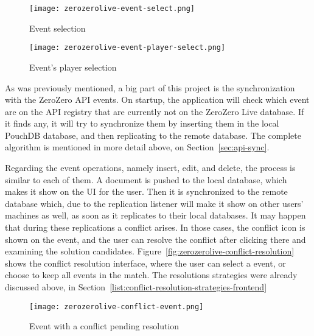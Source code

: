 \begin{figure}[ht]
    \begin{center}
        \leavevmode
        \texttt{[image: zerozerolive-event-select.png]}
        \caption{Event selection}
        \label{fig:zerozerolive-event-select}
    \end{center}
\end{figure}

\begin{figure}[ht]
    \begin{center}
        \leavevmode
        \texttt{[image: zerozerolive-event-player-select.png]}
        \caption{Event's player selection}
        \label{fig:zerozerolive-event-player-select}
    \end{center}
\end{figure}

As was previously mentioned, a big part of this project is the synchronization with the ZeroZero API events. On startup, the application will check which event are on the API registry that are currently not on the ZeroZero Live database. If it finds any, it will try to synchronize them by inserting them in the local PouchDB database, and then replicating to the remote database. The complete algorithm is mentioned in more detail above, on Section~\ref{sec:api-sync}. 

Regarding the event operations, namely insert, edit, and delete, the process is similar to each of them. A document is pushed to the local database, which makes it show on the UI for the user. Then it is synchronized to the remote database which, due to the replication listener will make it show on other users' machines as well, as soon as it replicates to their local databases. It may happen that during these replications a conflict arises. In those cases, the conflict icon is shown on the event, and the user can resolve the conflict after clicking there and examining the solution candidates. Figure~\ref{fig:zerozerolive-conflict-resolution} shows the conflict resolution interface, where the user can select a  event, or choose to keep all events in the match. The resolutions strategies were already discussed above, in Section~\ref{list:conflict-resolution-strategies-frontend}

\begin{figure}[ht]
    \begin{center}
        \leavevmode
        \texttt{[image: zerozerolive-conflict-event.png]}
        \caption{Event with a conflict pending resolution}
        \label{fig:zerozerolive-conflict-event}
    \end{center}
\end{figure}

